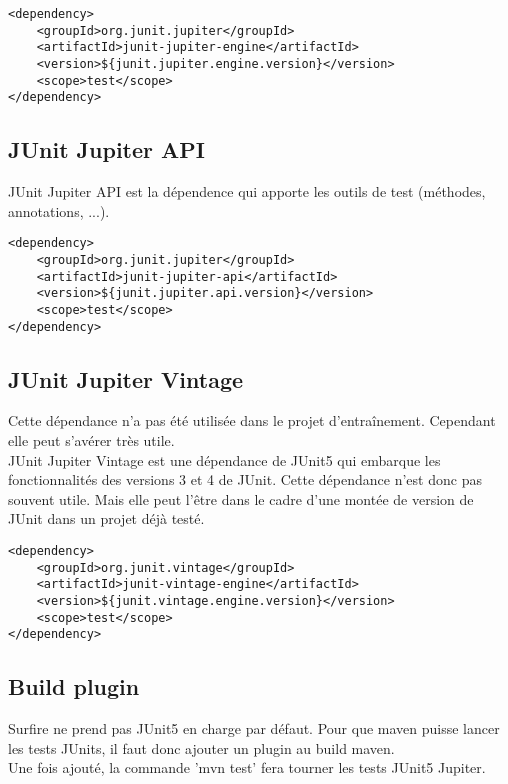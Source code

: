 \documentclass[12pt]{article}		%
\begin{document}
\lstset{language=XML, numbers=left}
\begin{lstlisting}
<dependency>
    <groupId>org.junit.jupiter</groupId>
    <artifactId>junit-jupiter-engine</artifactId>
    <version>${junit.jupiter.engine.version}</version>
    <scope>test</scope>
</dependency>
\end{lstlisting}

\subsection{JUnit Jupiter API}

JUnit Jupiter API est la dépendence qui apporte les outils de test (méthodes, annotations, ...).

\lstset{language=XML, numbers=left}
\begin{lstlisting}
<dependency>
    <groupId>org.junit.jupiter</groupId>
    <artifactId>junit-jupiter-api</artifactId>
    <version>${junit.jupiter.api.version}</version>
    <scope>test</scope>
</dependency>
\end{lstlisting}

\subsection{JUnit Jupiter Vintage}

Cette dépendance n'a pas été utilisée dans le projet d'entraînement. Cependant elle peut s'avérer très utile. \\ JUnit Jupiter Vintage est une dépendance de JUnit5 qui embarque les fonctionnalités des versions 3 et 4 de JUnit. Cette dépendance n'est donc pas souvent utile. Mais elle peut l'être dans le cadre d'une montée de version de JUnit dans un projet déjà testé.

\lstset{language=XML, numbers=left}
\begin{lstlisting}
<dependency>
    <groupId>org.junit.vintage</groupId>
    <artifactId>junit-vintage-engine</artifactId>
    <version>${junit.vintage.engine.version}</version>
    <scope>test</scope>
</dependency>
\end{lstlisting}

\subsection{Build plugin}

Surfire ne prend pas JUnit5 en charge par défaut. Pour que maven puisse lancer les tests JUnits, il faut donc ajouter un plugin au build maven. \\ Une fois ajouté, la commande 'mvn test' fera tourner les tests JUnit5 Jupiter.
\end{document}
